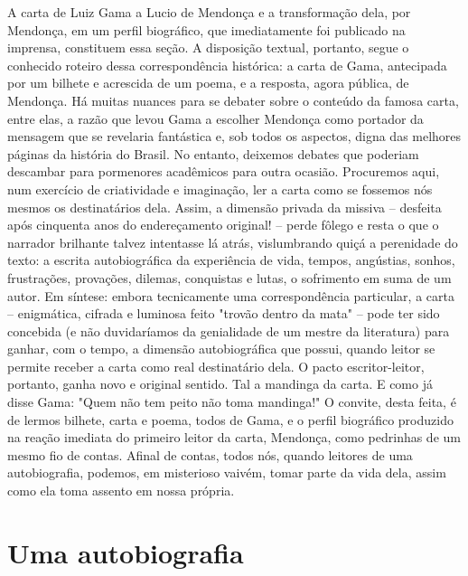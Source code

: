 {\small\noindent
A carta de Luiz Gama a Lucio de Mendonça e a transformação dela,
por Mendonça, em um perfil biográfico, que imediatamente foi publicado
na imprensa, constituem essa seção. A disposição textual, portanto,
segue o conhecido roteiro dessa correspondência histórica: a carta de
Gama, antecipada por um bilhete e acrescida de um poema, e a resposta,
agora pública, de Mendonça. Há muitas nuances para se debater sobre o
conteúdo da famosa carta, entre elas, a razão que levou Gama a escolher
Mendonça como portador da mensagem que se revelaria fantástica e, sob
todos os aspectos, digna das melhores páginas da história do Brasil. No
entanto, deixemos debates que poderiam descambar para pormenores
acadêmicos para outra ocasião. Procuremos aqui, num exercício de
criatividade e imaginação, ler a carta como se fossemos nós mesmos os
destinatários dela. Assim, a dimensão privada da missiva -- desfeita
após cinquenta anos do endereçamento original! -- perde fôlego e resta o
que o narrador brilhante talvez intentasse lá atrás, vislumbrando quiçá
a perenidade do texto: a escrita autobiográfica da experiência de vida,
tempos, angústias, sonhos, frustrações, provações, dilemas, conquistas e
lutas, o sofrimento em suma de um autor. Em síntese: embora tecnicamente
uma correspondência particular, a carta -- enigmática, cifrada e
luminosa feito "trovão dentro da mata" -- pode ter sido concebida (e não
duvidaríamos da genialidade de um mestre da literatura) para ganhar, com
o tempo, a dimensão autobiográfica que possui, quando leitor se permite
receber a carta como real destinatário dela. O pacto escritor-leitor,
portanto, ganha novo e original sentido. Tal a mandinga da carta. E como
já disse Gama: "Quem não tem peito não toma mandinga!" O convite, desta
feita, é de lermos bilhete, carta e poema, todos de Gama, e o perfil
biográfico produzido na reação imediata do primeiro leitor da carta,
Mendonça, como pedrinhas de um mesmo fio de contas. Afinal de contas,
todos nós, quando leitores de uma autobiografia, podemos, em misterioso
vaivém, tomar parte da vida dela, assim como ela toma assento em nossa
própria.}

\part{Uma autobiografia}

%
%
%
%
%
%
%

